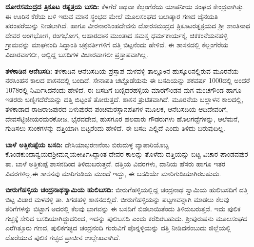 \textbf{ದೋರಸಮುದ್ರದ ತ್ರಿಕೂಟ ರತ್ನತ್ರಯ ಬಸದಿ:} ಕೆಳಗೆರೆ ಅಥವಾ ಕೆಲ್ಲಂಗೆರೆಯ ಯಾಪನೀಯ ಸಂಘದ ಕೇಂದ್ರ\-ವಾಗಿತ್ತು. ಈ ಊರಿನ ಕೆರೆಯ ಬಳಿ ಇರುವ ಮಾನ ಸ್ಥಂಭದ ಮೇಲೆ ಮೂಲಸಂಘದ ಬಲಾತ್ಕಾರ ಗಣದ ಜೈನಯತಿ ಪರಂಪರೆಯನ್ನು ನೀಡಲಾಗಿದೆ. ಹಾಗೂ ವೀರನಾರಸಿಂಹದೇವನು ದೋರಸಮುದ್ರದ ತ್ರಿಕೂಟರತ್ನತ್ರಯದ ಶ‍್ರೀ ಶಾಂತಿನಾಥ ದೇವರ ಅಂಗಭೋಗ, ರಂಗಭೋಗ, ಆಹಾರದಾನ ಮುಂತಾದ ಸಮಸ್ತ ಧರ್ಮಕಾರ್ಯಕ್ಕೆ, ಚಿಕಕಂನೆಯನಹಳ್ಳಿ ಗ್ರಾಮವನ್ನು ಮಾಘನಂದಿ ಸಿದ್ಧಾಂತಿ ಚಕ್ರವರ್ತಿಗಳಿಗೆ ದತ್ತಿ ಬಿಟ್ಟನೆಂದು ಹೇಳಿದೆ. ಈ ಶಾಸನದಲ್ಲಿ ಕೆಲ್ಲಂಗೆರೆಯ ವಿಚಾರವಾಗಲೀ, ಅಲ್ಲಿದ್ದ ಬಸದಿಗಳ ವಿಚಾರವಾಗಲೀ ಪ್ರಸ್ತಾಪವಾಗಿಲ್ಲ.

\textbf{ತಳಕಾಡಿನ ಆನೆಬಸದಿ:} ತಳಕಾಡಿನ ಆನೆಬಸದಿಯ ಪ್ರಸ್ತಾಪ ಮಳವಳ್ಳಿ ತಾಲ್ಲೂಕಿನ ಹುಸ್ಕೂರಿನಲ್ಲಿರುವ ಮೂರನೆಯ ನರಸಿಂಹನ ಕಾಲದ ಶಾಸನದಲ್ಲಿ ಬಂದಿದೆ. ಸೇನಾಪತಿ ಚಟ್ಟೊಡೆಯನು ಈ ಬಸದಿಯನ್ನು ಶಕವರ್ಷ 1000ದಲ್ಲಿ ಅಂದರೆ 1078ರಲ್ಲಿ ನಿರ್ಮಿಸಿದನೆಂದು ಹೇಳಿದೆ. ಈ ಬಸದಿಗೆ ಬಣ್ನಿದರಹಳ್ಳಿಯ ಮಾರಗೌಂಡನ ಮಗ ಮಂಚಗೌಂಡ ಹಾಗೂ ಇತರರು ಬಣ್ನಿಗದೆರೆಯನ್ನು ದತ್ತಿ ಬಿಟ್ಟಂತೆ ತೋರುತ್ತದೆ. ಶಾಸನ ತ್ರುಟಿತವಾಗಿದೆ. ಮೂರನೆಯ ಬಲ್ಲಾಳನ ಕಾಲದಲ್ಲಿ, ತಳಕಾಡಾದ ರಾಜರಾಜಪುರದ ಏಳುಪುರದ ಪಂಚಮಠಸ್ಥಾನಪತಿಗಳ ಮೂಲಕ, ಆನೆಬಸದಿಯ ಆದಿದೇವರಿಗೆ, ದೇವಸೆಟ್ಟಿಜೀಯರ\break ಮರಕೋಜ, ಭೈರವದೇವ, ಹುಸಗೂರ ಹಲವಾರು ಗೌಡರುಗಳು ಹೊಲಗದ್ದೆಗಳನ್ನು, ಆಲೆಮನೆ, ಗುಡಿಸಲು ಸುಂಕಗಳನ್ನು ದತ್ತಿಯಾಗಿ ಬಿಟ್ಟರೆಂದು ಹೇಳಿದೆ. ಈ ಬಸದಿ ಎಲ್ಲಿದೆ ಎಂದು ತಿಳಿದು ಬರುವುದಿಲ್ಲ.

\textbf{ಬಾಳೆ ಅತ್ತಿಕುಪ್ಪೆಯ ಬಸದಿ:} ದೇಸಿಯಾಭರಣನೆಂಬ ಬಿರುದುಳ್ಳ ವ್ಯಾಪಾರಿಯೊಬ್ಬ ಕೊಂಡಕುಂದಾನ್ವಯದ\break ಶ‍್ರೀಮನ್ನಯಕೀರ್ತಿಸಿದ್ಧಾಂತ ದೇವರ ಕಾಲನ್ನು ತೊಳೆದು ದತ್ತಿಯನ್ನು ಬಿಟ್ಟ ವಿಚಾರ ಪಾಂಡವಪುರ ತಾ. ಬಾಳೆ ಅತ್ತಿಕುಪ್ಪೆ ಶಾಸನದಿಂದ ತಿಳಿದುಬರುತ್ತದೆ. ದತ್ತಿಯ ವಿವರಗಳು, ದಾನಿಯ ಹೆಸರು ಹಾಗೂ ಇತರ ವಿವರಗಳಿಲ್ಲ.ಈ ಶಾಸನವು ಮಾರಿಗುಡಿಯ ಮುಂದೆ ಇದ್ದು, ಈ ಬಸದಿಯೇ ಮಾರಿಗುಡಿಯಾಗಿರಬಹುದು.

\textbf{ಬೀರುಗೆಹಳ್ಳಿಯ ಚಂದ್ರನಾಥಸ್ವಾಮಿಯ ಹುಲಿಬಸದಿ:} ಬೀರುಗೆಹಳ್ಳಿಯಲ್ಲಿದ್ದ ಚಂದ್ರನಾಥ ಸ್ವಾಮಿಯ ಹುಲಿಬಸದಿಗೆ ದತ್ತಿ ಬಿಟ್ಟ ವಿಚಾರ ಮಳವಳ್ಳಿ ತಾ. ತಿಗಡಹಳ್ಳಿ ಶಾಸನದಲ್ಲಿದೆ. ಬೀರುಗೆಹಳ್ಳಿಯನ್ನು ಪಟ್ಟಣವನ್ನಾಗಿ ಮಾಡಲು ಕೆಲವು ತೆರಿಗೆಗಳನ್ನು ಬಿಟ್ಟಾಗ ಅದರಲ್ಲಿ ಕೆಲವು ಭಾಗವನ್ನು ಈ ಬಸದಿಗೆ ಬಿಡಲಾಯಿತೆಂದು ತಿಳಿದುಬರುತ್ತದೆ. ಇದು ಪುಲಿಕ ಗಚ್ಛಕ್ಕೆ ಸೇರಿದ ಬಸದಿಯಾಗಿದ್ದುದರಿಂದ, ಇದನ್ನು ಪುಲಿಬಸದಿ ಎಂದು ಕರೆದಿರಬಹುದು. ಶ‍್ರೀಪುರುಷನು ಮೂಲಸಂಘದ ಎರೆಗಿತ್ತೂರು ಗಣದ, ಪುಲಿಕಗಚ್ಛದ ಚಂದ್ರನಂದಿ ಗುರುವಿಗೆ ಪೊನ್ನಳ್ಳಿಯನ್ನು ದತ್ತಿ ನೀಡಿದನೆಂಬುದು ಜಿಲ್ಲೆಯಲ್ಲಿ ದೊರೆಯುವ ಪುಲಿಕ ಗಚ್ಛದ ಪ್ರಾಚೀನ ಉಲ್ಲೇಖವಾಗಿದೆ. 


